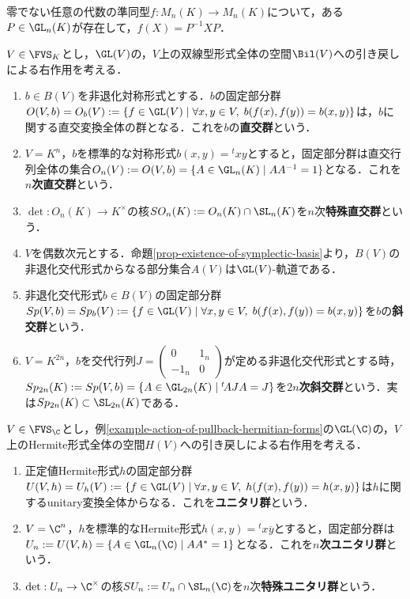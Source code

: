 \documentclass[uplatex, dvipdfmx]{jsreport}
\begin{document}
\begin{proposition}
    零でない任意の代数の準同型$f:M_n(K)\to M_n(K)$について，ある$P\in\GL_n(K)$が存在して，$f(X)=P^{-1}XP$．
\end{proposition}

\begin{example}
    $V\in\FVS_K$とし，$\GL(V)$の，$V$上の双線型形式全体の空間$\Bil(V)$への引き戻しによる右作用を考える．
    \begin{enumerate}
        \item $b\in B(V)$を非退化対称形式とする．$b$の固定部分群$O(V,b)=O_b(V):=\{f\in\GL(V)\mid \forall x,y\in V,\;b(f(x),f(y))=b(x,y)\}$は，$b$に関する直交変換全体の群となる．これを$b$の\textbf{直交群}という．
        \item $V=K^n$，$b$を標準的な対称形式$b(x,y)={}^t\!xy$とすると，固定部分群は直交行列全体の集合$O_n(V):=O(V,b)=\{A\in\GL_n(K)\mid AA^{-1}=1\}$となる．これを\textbf{$n$次直交群}という．
        \item $\det:O_n(K)\to K^\times$の核$SO_n(K):=O_n(K)\cap\SL_n(K)$を$n$次\textbf{特殊直交群}という．
        \item $V$を偶数次元とする．命題\ref{prop-existence-of-symplectic-basis}より，$B(V)$の非退化交代形式からなる部分集合$A(V)$は$\GL(V)$-軌道である．
        \item 非退化交代形式$b\in B(V)$の固定部分群$Sp(V,b)=Sp_b(V):=\{f\in\GL(V)\mid \forall x,y\in V,\;b(f(x),f(y))=b(x,y)\}$を$b$の\textbf{斜交群}という．
        \item $V=K^{2n}$，$b$を交代行列$J=\begin{pmatrix}0&1_n\\-1_n&0\end{pmatrix}$が定める非退化交代形式とする時，$Sp_{2n}(K):=Sp(V,b)=\{A\in\GL_{2n}(K)\mid {}^t\!AJA=J\}$を\textbf{$2n$次斜交群}という．実は$Sp_{2n}(K)\subset\SL_{2n}(K)$である．
    \end{enumerate}
\end{example}

\begin{example}
    $V\in\FVS_\C$とし，例\ref{example-action-of-pullback-hermitian-forms}の$\GL(\C)$の，$V$上のHermite形式全体の空間$H(V)$への引き戻しによる右作用を考える．
    \begin{enumerate}
        \item 正定値Hermite形式$h$の固定部分群$U(V,h)=U_h(V):=\{f\in\GL(V)\mid\forall x,y\in V,\;h(f(x),f(y))=h(x,y)\}$は$h$に関するunitary変換全体からなる．これを\textbf{ユニタリ群}という．
        \item $V=\C^n$，$h$を標準的なHermite形式$h(x,y)={}^t\!x\overline{y}$とすると，固定部分群は$U_n:=U(V,h)=\{A\in\GL_n(\C)\mid AA^*=1\}$となる．これを\textbf{$n$次ユニタリ群}という．
        \item $\det:U_n\to\C^\times$の核$SU_n:=U_n\cap\SL_n(\C)$を$n$次\textbf{特殊ユニタリ群}という．
    \end{enumerate}
\end{example}
\end{document}
